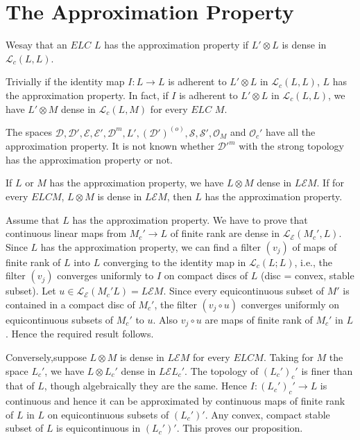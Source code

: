 
\chapter{The Approximation Property}\label{chap5}

\setcounter{section}{5}
\setcounter{definition}{0}
\begin{definition}\label{chap5:def5.1}
We\pageoriginale say that an $ELC$ $L$ has the approximation property
if $L' \otimes L$ is dense in $\mathscr{L}_c(L, L)$. 

Trivially if the identity map $I : L \to L$ is adherent to $L' \otimes
L$ in $\mathscr{L}_c(L, L)$, $L$ has the approximation property. In
fact, if $I$ is adherent to $L' \otimes L$ in $\mathscr{L}_c(L, L)$, we
have $L' \otimes M$ dense in $\mathscr{L}_c(L, M)$ for every $E L C$
$M$.

The spaces $\mathscr{D}, \mathscr{D}', \mathscr{E}, \mathscr{E}',
\mathscr{D}^m, L', (\mathscr{D}')^{(o)}, \mathscr{S}, \mathscr{S}',
\mathscr{O}_M$ and $\mathscr{O}_c'$ have all the approximation
property. It is not known whether $\mathscr{D}'^m$ with the strong
topology has the approximation property or not.
\end{definition}

\setcounter{section}{5}
\setcounter{prop}{0}
\begin{prop}\label{chap5:prop5.1}
If $L$ or $M$ has the approximation property, we have $L \otimes M$
dense in $L \mathcal{E} M$. If for every $E L C M$, $L \otimes M$ is
dense in $L \mathcal{E} M$, then $L$ has the approximation property.

Assume that $L$ has the approximation property. We have to prove that
continuous linear maps from $M_c' \to L$ of finite rank are dense in
$\mathscr{L}_{\mathcal{E}}(M_c', L)$. Since $L$ has the approximation property,
we can find a filter $(v_j)$ of maps of finite rank of $L$ into $L$
converging to the identity map in $\mathscr{L}_c(L; L)$, i.e., the
filter $(v_j)$ converges uniformly to $I$ on compact discs of $L$
(disc = convex, stable subset). Let $u \in \mathscr{L}_\mathcal{E}
(M_c' L) = L \mathcal{E} M$. Since every equicontinuous subset of $M'$
is contained in a compact disc of $M_c'$, the filter $(v_j \circ u)$
converges uniformly on equicontinuous subsets of $M_c'$ to $u$. Also
$v_j \circ u$ are maps of finite rank of $M_c'$ in $L$. Hence the
required result follows.

Conversely,\pageoriginale suppose $L \otimes M$ is dense in $L
\mathcal{E} M$ for every $ E L C M$. Taking for $M$ the space $L_c'$,
we have $L \otimes L_c'$ dense in $L \mathcal{E} L_c'$. The topology
of $(L_c')_c'$ is finer than that of $L$, though algebraically they
are the same. Hence $I : (L_c')_c' \to L$ is continuous and hence it
can be approximated by continuous maps of finite rank of $L$ in $L$ on
equicontinuous subsets of $(L_c')'$. Any convex, compact stable subset
of $L$ is equicontinuous in $(L_c')'$. This proves our proposition.
\end{prop}

